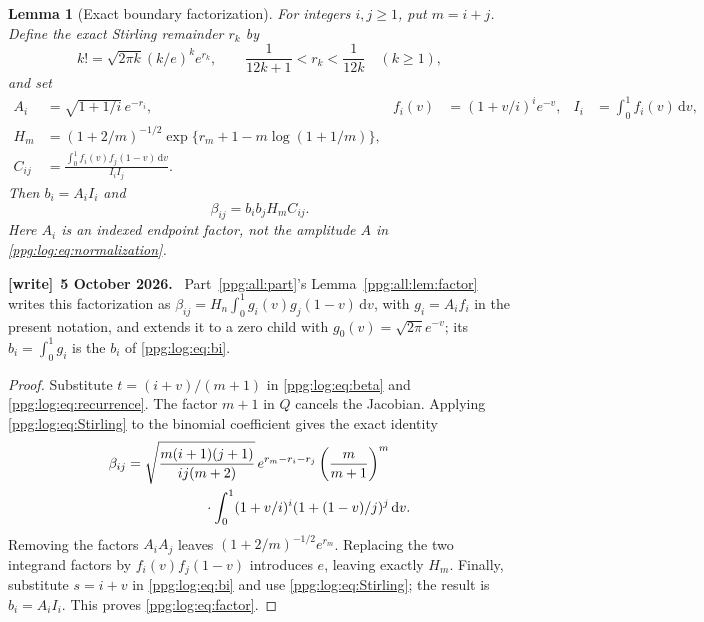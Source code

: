 \documentclass[11pt,letterpaper]{article}
\newtheorem{lemma}[theorem]{Lemma}
\theoremstyle{remark}\newtheorem{remark}[theorem]{Remark}
\numberwithin{equation}{section}
\newcommand{\dd}{\mathrm d}
\newenvironment{writenote}[1][]{\par\smallskip\begingroup\small
 \noindent\textbf{[write]}\if\relax\detokenize{#1}\relax\else~\textbf{#1.}\fi\ }%
 {\par\endgroup\smallskip}
\begin{document}
\begin{lemma}[Exact boundary factorization]\label{ppg:log:lem:factor}
For integers $i,j\ge1$, put $m=i+j$. Define the exact Stirling remainder $r_k$ by
\begin{equation}\label{ppg:log:eq:Stirling}
 k!=\sqrt{2\pi k}(k/e)^ke^{r_k},\qquad
 \frac1{12k+1}<r_k<\frac1{12k}\quad(k\ge1),
\end{equation}
and set
\begin{align}
 A_i&=\sqrt{1+1/i}\,e^{-r_i},&
 f_i(v)&=(1+v/i)^ie^{-v},& I_i&=\int_0^1f_i(v)\,\dd v,\label{ppg:log:eq:fi}\\
 H_m&=(1+2/m)^{-1/2}\exp\{r_m+1-m\log(1+1/m)\},\label{ppg:log:eq:Hm}\\
 C_{ij}&=\frac{\int_0^1f_i(v)f_j(1-v)\,\dd v}{I_iI_j}.
 \label{ppg:log:eq:Cij}
\end{align}
Then $b_i=A_iI_i$ and
\begin{equation}\label{ppg:log:eq:factor}
 \beta_{ij}=b_ib_jH_mC_{ij}.
\end{equation}
Here $A_i$ is an indexed endpoint factor, not the amplitude $A$ in \eqref{ppg:log:eq:normalization}.
\end{lemma}
\begin{writenote}[5 October 2026]
Part~\ref{ppg:all:part}'s Lemma~\ref{ppg:all:lem:factor} writes this factorization as $\beta_{ij}=H_n\int_0^1g_i(v)g_j(1-v)\,\dd v$, with $g_i=A_if_i$ in the present notation, and extends it to a zero child with $g_0(v)=\sqrt{2\pi}e^{-v}$; its $b_i=\int_0^1g_i$ is the $b_i$ of \eqref{ppg:log:eq:bi}.
\end{writenote}
\begin{proof}
Substitute $t=(i+v)/(m+1)$ in \eqref{ppg:log:eq:beta} and \eqref{ppg:log:eq:recurrence}. The factor $m+1$ in $Q$ cancels the Jacobian. Applying \eqref{ppg:log:eq:Stirling} to the binomial coefficient gives the exact identity
\begin{align}\label{ppg:log:eq:modalexact}
 \beta_{ij}
 ={}&\sqrt{\frac{m(i+1)(j+1)}{ij(m+2)}}\,
 e^{r_m-r_i-r_j}\left(\frac m{m+1}\right)^m\nonumber\\
 &\hspace{15mm}\cdot\int_0^1(1+v/i)^i(1+(1-v)/j)^j\,\dd v.
\end{align}
Removing the factors $A_iA_j$ leaves $(1+2/m)^{-1/2}e^{r_m}$. Replacing the two integrand factors by $f_i(v)f_j(1-v)$ introduces $e$, leaving exactly $H_m$. Finally, substitute $s=i+v$ in \eqref{ppg:log:eq:bi} and use \eqref{ppg:log:eq:Stirling}; the result is $b_i=A_iI_i$. This proves \eqref{ppg:log:eq:factor}.
\end{proof}
\end{document}
